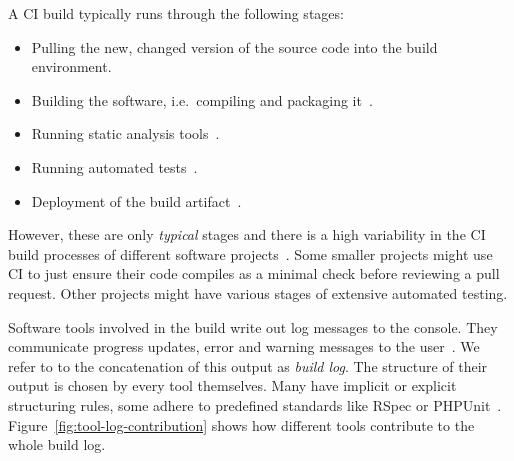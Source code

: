 \documentclass[\myrootdir/main.tex]{subfiles}
\begin{document}
A CI build typically runs through the following stages:
\begin{itemize}
	\item Pulling the new, changed version of the source code into the build environment.
	\item Building the software, i.e.\ compiling and packaging it~\cite{phillips2014understanding}.
	\item Running static analysis tools~\cite{zampetti2017open}.
	\item Running automated tests~\cite{beller2017oops}.
	\item Deployment of the build artifact~\cite{schermann2016empirical}.
\end{itemize}

However, these are only \emph{typical} stages and there is a high variability in the CI build processes of different software projects~\cite{staahl2014modeling}.
Some smaller projects might use CI to just ensure their code compiles as a minimal check before reviewing a pull request.
Other projects might have various stages of extensive automated testing.

Software tools involved in the build write out log messages to the console.
They communicate progress updates, error and warning messages to the user~\cite{yuan2012characterizing}.
We refer to to the concatenation of this output as \emph{build log}.
The structure of their output is chosen by every tool themselves.
Many have implicit or explicit structuring rules, some adhere to predefined standards like RSpec or PHPUnit~\cite{phpunit2019logging,rspec2019format}.
Figure~\ref{fig:tool-log-contribution} shows how different tools contribute to the whole build log.
\end{document}
